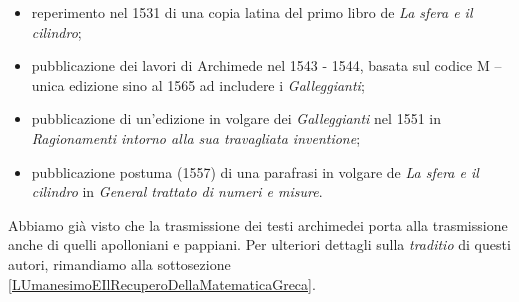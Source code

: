 \begin{itemize}
	\item reperimento nel 1531 di una copia latina del primo libro de \textit{La sfera e il cilindro};
	\item pubblicazione dei lavori di Archimede nel 1543 - 1544, basata sul codice M -- unica edizione sino al 1565 ad includere i \textit{Galleggianti};
	\item pubblicazione di un'edizione in volgare dei \textit{Galleggianti} nel 1551 in \textit{Ragionamenti intorno alla sua travagliata inventione};
	\item pubblicazione postuma (1557) di una parafrasi in volgare de \textit{La sfera e il cilindro} in \textit{General trattato di numeri e misure}.
\end{itemize}
\par Abbiamo gi\`a visto che la trasmissione dei testi archimedei porta alla trasmissione anche di quelli apolloniani e pappiani. Per ulteriori dettagli sulla \textit{traditio} di questi autori, rimandiamo alla sottosezione \ref{LUmanesimoEIlRecuperoDellaMatematicaGreca}.
